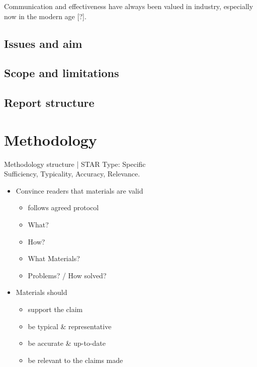 \documentclass[a4paper,11pt]{article}
\newcounter{counterTODO}\setcounter{counterTODO}{1}
\newcommand\TODO[2][]{%
  \ifshowTodo{%
    \def\varTODOtext{\textcolor{purple}{\texttt{<}\textbf{TODO}\#\arabic{counterTODO}\texttt{: #2>}}}
    \def\varTODOContentLine{\textcolor{purple}{#2}}
    \ifthenelse{\isempty{#1}}%
      {%
        \addcontentsline{tocTODO}{section}{\vspace{-0.3cm}\varTODOContentLine}%
        \varTODOtext\\%
      }%
      {%
        \addcontentsline{tocTODO}{section}{\vspace{-0.3cm}\sout{\varTODOContentLine}}%
      }%
      \stepcounter{counterTODO}%
  }\fi%
}
\newcommand\TODOCite{\ifshowTodo{\textcolor{blue}{\texttt{\textit{[Finalize
          citations]}}}}\else[?]\fi}
\newif\ifshowTodo
\begin{document}
  \TODO[]{Finish Introduction}

  Communication and effectiveness have always been valued in industry,
  especially now in the modern age {\TODOCite}. \\


  \subsection{Issues and aim}

    \TODO[]{Finish Issues and aim}

  \subsection{Scope and limitations}

    \TODO[]{Finish Scope and limitation}

  \subsection{Report structure}

    \TODO[]{Finish Report structure}

\section{Methodology}

  \begin{notes}{Methodology structure | STAR}
    Type: Specific \\
    Sufficiency, Typicality, Accuracy, Relevance.
    \begin{itemize}
      \item{Convince readers that materials are valid}
        \begin{itemize}
          \item{follows agreed protocol}
          \item{What?}
          \item{How?}
          \item{What Materials?}
          \item{Problems? / How solved?}
        \end{itemize}
      \item{Materials should}
      \begin{itemize}
        \item{support the claim}
        \item{be typical \& representative}
        \item{be accurate \& up-to-date}
        \item{be relevant to the claims made}
      \end{itemize}
    \end{itemize}
  \end{notes}
\end{document}

